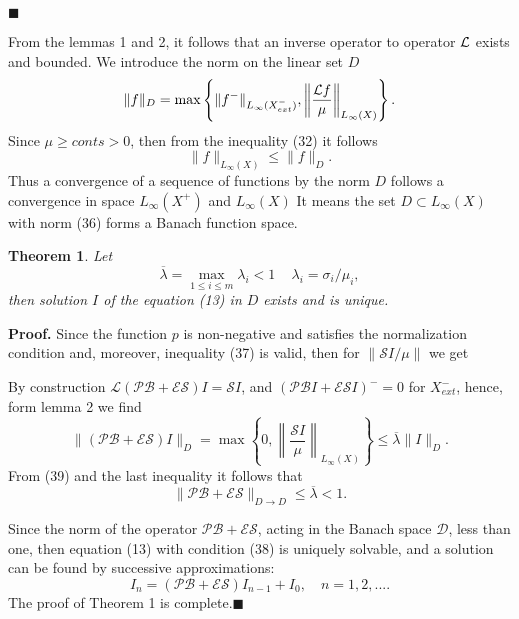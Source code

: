 \documentclass[12pt,reqno]{report}
\newtheorem{theorem}{Theorem}
\begin{document}
$\blacksquare$

From the lemmas 1 and 2, it follows that an inverse operator to operator ${\cal L}$ exists and bounded.
We introduce the norm on the linear set $D$
\begin{equation}
\|f\|_{D}= \max \left \{\|f^-\|_{L_{\infty}(X^-_{ext})},\left \|\frac{{\cal L}
	f}{\mu} \right\|_{L_{\infty}(X)}\right\}.
\end{equation}
Since $\mu \geq conts >0$, then from the inequality (32) it follows
\begin{equation}
\|f\|_{L_{\infty}(X)} \leq \|f\|_{D}.
\end{equation}
Thus a convergence of a sequence of functions by the norm $D$ 
follows a convergence in space $L_{\infty}(X^+)$ and $L_{\infty}(X)$
It means the set $D \subset L_{\infty}(X)$ with norm (36) forms a Banach function space.

\begin{theorem}
	Let
	\begin{equation}
	\overline{\lambda} = \max \limits_{1\leq i\leq m} \lambda_i
	<1\,\quad \lambda_i = \sigma_i/\mu_i,
	\end{equation}
	then solution $I$ of the equation (13) in $D$ exists and is unique.
\end{theorem}

{\bf Proof.} Since the function $p$ is non-negative and
satisfies the normalization condition and, moreover, 
inequality (37) is valid, then for $\|\mathcal S I/\mu \|$ we get

By construction $\mathcal L (\mathcal P \mathcal B + \mathcal E
\mathcal S) I = \mathcal S I$, and $(\mathcal P \mathcal B I +
\mathcal E \mathcal S I)^- =0$ for $X^-_{ext}$, hence, form lemma 2 we find
$$
\|(\mathcal P \mathcal B + \mathcal E \mathcal S) I\|_{D} = \max
\left\{ 0, \left \| \frac{\mathcal S I}{\mu} \right \|_{L_{\infty}(X)}
\right\} \leq \overline{\lambda} \|I\|_{D}.
$$
From (39) and the last inequality it follows that
$$
\|\mathcal P \mathcal B + \mathcal E \mathcal S\|_{D \to D} \leq
\overline{\lambda} <1.
$$

Since the norm of the operator $\mathcal P \mathcal B + \mathcal E
\mathcal S$, acting in the Banach space $\mathcal{D}$,
less than one, then equation (13) with condition (38) is
uniquely solvable, and a solution can be found by
successive approximations:
$$
I_n =(\mathcal P \mathcal B + \mathcal E \mathcal S)I_{n-1} +I_0,
\quad n=1,2,....
$$
The proof of Theorem 1 is complete.$\blacksquare$
\end{document}
